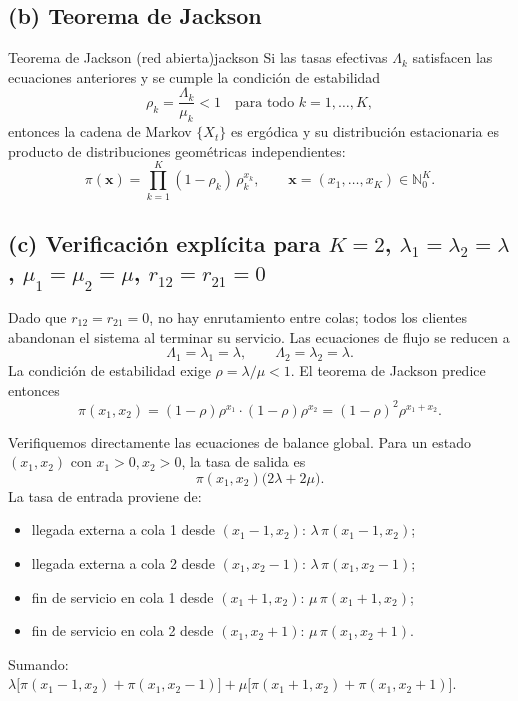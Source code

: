\documentclass[10pt,a4paper]{article}
\begin{document}
\subsection*{(b) Teorema de Jackson}
\begin{mytheo}{Teorema de Jackson (red abierta)}{jackson}
Si las tasas efectivas \( \Lambda_k \) satisfacen las ecuaciones anteriores y se cumple la condición de estabilidad
\[
\rho_k = \frac{\Lambda_k}{\mu_k} < 1 \quad \text{para todo } k = 1,\dots,K,
\]
entonces la cadena de Markov \( \{X_t\} \) es ergódica y su distribución estacionaria es producto de distribuciones geométricas independientes:
\[
\pi(\mathbf{x}) = \prod_{k=1}^{K} (1-\rho_k)\,\rho_k^{x_k}, \qquad \mathbf{x}=(x_1,\dots,x_K)\in\mathbb{N}_0^K.
\]
\end{mytheo}

\subsection*{(c) Verificación explícita para \( K=2 \), \( \lambda_1=\lambda_2=\lambda \), \( \mu_1=\mu_2=\mu \), \( r_{12}=r_{21}=0 \)}
Dado que \( r_{12}=r_{21}=0 \), no hay enrutamiento entre colas; todos los clientes abandonan el sistema al terminar su servicio. Las ecuaciones de flujo se reducen a
\[
\Lambda_1 = \lambda_1 = \lambda,\qquad \Lambda_2 = \lambda_2 = \lambda.
\]
La condición de estabilidad exige \( \rho = \lambda/\mu < 1 \). El teorema de Jackson predice entonces
\[
\pi(x_1,x_2) = (1-\rho)\rho^{x_1} \cdot (1-\rho)\rho^{x_2} = (1-\rho)^2 \rho^{x_1+x_2}.
\]

Verifiquemos directamente las ecuaciones de balance global. Para un estado \( (x_1,x_2) \) con \( x_1>0, x_2>0 \), la tasa de salida es
\[
\pi(x_1,x_2)\bigl(2\lambda+2\mu\bigr).
\]
La tasa de entrada proviene de:
\begin{itemize}
\item llegada externa a cola 1 desde \( (x_1-1,x_2) \): \( \lambda\,\pi(x_1-1,x_2) \);
\item llegada externa a cola 2 desde \( (x_1,x_2-1) \): \( \lambda\,\pi(x_1,x_2-1) \);
\item fin de servicio en cola 1 desde \( (x_1+1,x_2) \): \( \mu\,\pi(x_1+1,x_2) \);
\item fin de servicio en cola 2 desde \( (x_1,x_2+1) \): \( \mu\,\pi(x_1,x_2+1) \).
\end{itemize}
Sumando: \( \lambda\bigl[\pi(x_1-1,x_2)+\pi(x_1,x_2-1)\bigr] + \mu\bigl[\pi(x_1+1,x_2)+\pi(x_1,x_2+1)\bigr] \).
\end{document}
